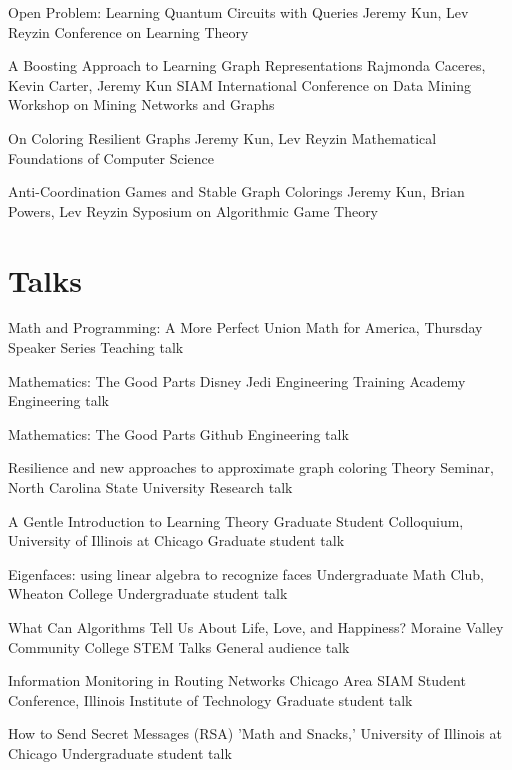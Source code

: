 \documentclass[11pt]{moderncv}
\begin{document}
  {Open Problem: Learning Quantum Circuits with Queries}
  {Jeremy Kun, Lev Reyzin}
  {Conference on Learning Theory}
  {}
  {}

  {A Boosting Approach to Learning Graph Representations}
  {Rajmonda Caceres, Kevin Carter, Jeremy Kun}
  {SIAM International Conference on Data Mining Workshop on Mining Networks and Graphs}
  {}
  {}

  {On Coloring Resilient Graphs}
  {Jeremy Kun, Lev Reyzin}
  {Mathematical Foundations of Computer Science}
  {}
  {}

  {Anti-Coordination Games and Stable Graph Colorings}
  {Jeremy Kun, Brian Powers, Lev Reyzin}
  {Syposium on Algorithmic Game Theory}
  {}
  {}

\section{Talks}

  {Math and Programming: A More Perfect Union}
  {Math for America, Thursday Speaker Series}
  {Teaching talk}
  {}
  {}

  {Mathematics: The Good Parts}
  {Disney Jedi Engineering Training Academy}
  {Engineering talk}
  {}
  {}

  {Mathematics: The Good Parts}
  {Github}
  {Engineering talk}
  {}
  {}

  {Resilience and new approaches to approximate graph coloring}
  {Theory Seminar, North Carolina State University}
  {Research talk}
  {}
  {}

  {A Gentle Introduction to Learning Theory}
  {Graduate Student Colloquium, University of Illinois at Chicago}
  {Graduate student talk}
  {}
  {}

  {Eigenfaces: using linear algebra to recognize faces}
  {Undergraduate Math Club, Wheaton College}
  {Undergraduate student talk}
  {}
  {}

  {What Can Algorithms Tell Us About Life, Love, and Happiness?}
  {Moraine Valley Community College STEM Talks}
  {General audience talk}
  {}
  {}

  {Information Monitoring in Routing Networks}
  {Chicago Area SIAM Student Conference, Illinois Institute of Technology}
  {Graduate student talk}
  {}
  {}

  {How to Send Secret Messages (RSA)}
  {'Math and Snacks,' University of Illinois at Chicago}
  {Undergraduate student talk}
  {}
  {}
\end{document}

